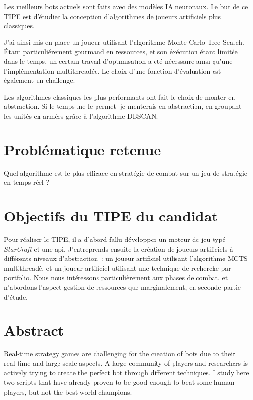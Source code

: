 \documentclass[a4paper, 12pt]{article}
\begin{document}
Les meilleurs bots actuels sont faits avec des modèles IA neuronaux.
Le but de ce TIPE est d'étudier la conception d'algorithmes de joueurs artificiels plus classiques.

J'ai ainsi mis en place un joueur utilisant l'algorithme Monte-Carlo Tree Search.
Étant particuliérement gourmand en ressources, et son éxécution étant limitée dans le temps,
un certain travail d'optimisation a été nécessaire ainsi qu'une l'implémentation multithreadée.
Le choix d'une fonction d'évaluation est également un challenge.\cite{MCTSRTS}\cite{MCTStactical}

Les algorithmes classiques les plus performants ont fait le choix de monter en abstraction.
Si le temps me le permet, je monterais en abstraction, en groupant les unités en armées grâce à l'algorithme DBSCAN.
\cite{dbscan}\cite{combatmodel}


\section*{Problématique retenue}
Quel algorithme est le plus efficace en stratégie de combat sur un jeu de stratégie en temps réel ?

\section*{Objectifs du TIPE du candidat}
Pour réaliser le TIPE, il a d'abord fallu développer un moteur de jeu typé \emph{StarCraft} et une api.
J'entreprends ensuite la création de joueurs artificiels à différents niveaux d'abstraction :
un joueur artificiel utilisant l'algorithme MCTS multithreadé, et un joueur artificiel utilisant une technique de recherche par portfolio.
Nous nous intéressons particulièrement aux phases de combat, et n'abordons l'aspect gestion de ressources que marginalement, en seconde partie d'étude.

\section*{Abstract}

Real-time strategy games are challenging for the creation of bots due to their real-time and large-scale aspects.
A large community of players and researchers is actively trying to create the perfect bot through different techniques.
I study here two scripts that have already proven to be good enough to beat some human players, but not the best world champions.



\end{document}
